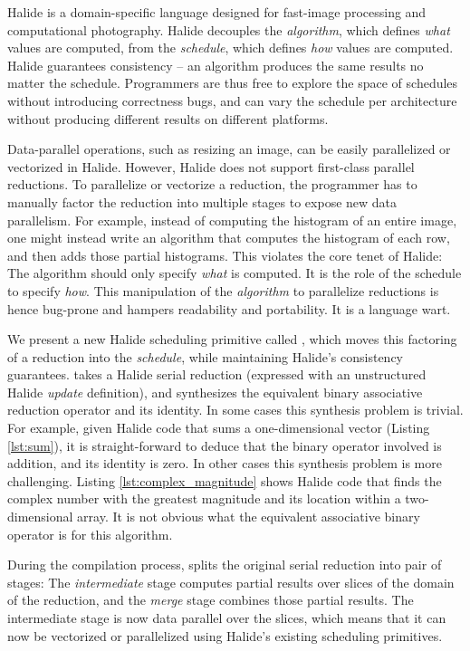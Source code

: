 Halide \cite{Ragan-Kelley:2013:HLC:2491956.2462176} is a domain-specific language designed for fast-image processing and computational photography. Halide decouples the \emph{algorithm}, which defines \emph{what} values are computed, from the \emph{schedule}, which defines \emph{how} values are computed. Halide guarantees consistency -- an algorithm produces the same results no matter the schedule. Programmers are thus free to explore the space of schedules without introducing correctness bugs, and can vary the schedule per architecture without producing different results on different platforms.

Data-parallel operations, such as resizing an image, can be easily parallelized or vectorized in Halide. However, Halide does not support first-class parallel reductions. To parallelize or vectorize a reduction, the programmer has to manually factor the reduction into multiple stages to expose new data parallelism. For example, instead of computing the histogram of an entire image, one might instead write an algorithm that computes the histogram of each row, and then adds those partial histograms. This violates the core tenet of Halide: The algorithm should only specify \emph{what} is computed. It is the role of the schedule to specify \emph{how}. This manipulation of the \emph{algorithm} to parallelize reductions is hence bug-prone and hampers readability and portability. It is a language wart.

We present a new Halide scheduling primitive called , which moves this factoring of a reduction into the \emph{schedule}, while maintaining Halide's consistency guarantees.  takes a Halide serial reduction (expressed with an unstructured Halide \emph{update} definition), and synthesizes the equivalent binary associative reduction operator and its identity. In some cases this synthesis problem is trivial. For example, given Halide code that sums a one-dimensional vector (Listing \ref{lst:sum}), it is straight-forward to deduce that the binary operator involved is addition, and its identity is zero. In other cases this synthesis problem is more challenging. Listing \ref{lst:complex_magnitude} shows Halide code that finds the complex number with the greatest magnitude and its location within a two-dimensional array. It is not obvious what the equivalent associative binary operator is for this algorithm.

During the compilation process,  splits the original serial reduction into pair of stages: The \emph{intermediate} stage computes partial results over slices of the domain of the reduction, and the \emph{merge} stage combines those partial results. The intermediate stage is now data parallel over the slices, which means that it can now be vectorized or parallelized using Halide's existing scheduling primitives.


